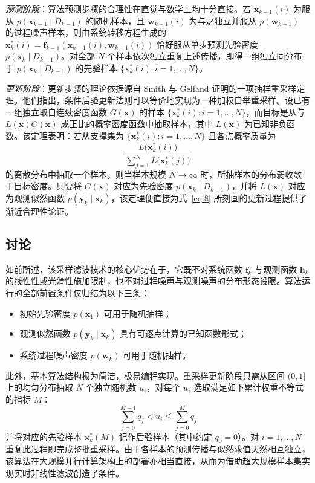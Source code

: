 \emph{预测阶段}：算法预测步骤的合理性在直觉与数学上均十分直接。若 $\bm{x}_{k-1}(i)$ 为服从 $p(\bm{x}_{k-1} \mid D_{k-1})$ 的随机样本，且 $\bm{w}_{k-1}(i)$ 为与之独立并服从 $p(\bm{w}_{k-1})$ 的过程噪声样本，则由系统转移方程生成的 $\bm{x}_k^*(i) = \bm{f}_{k-1}(\bm{x}_{k-1}(i), \bm{w}_{k-1}(i))$ 恰好服从单步预测先验密度 $p(\bm{x}_k \mid D_{k-1})$。对全部 $N$ 个样本依次独立重复上述传播，即得一组独立同分布于 $p(\bm{x}_k \mid D_{k-1})$ 的先验样本 $\{\bm{x}_k^*(i) : i = 1, \dots, N\}$。

\emph{更新阶段}：更新步骤的理论依据源自 Smith 与 Gelfand \cite{r14} 证明的一项抽样重采样定理。他们指出，条件后验更新法则可以等价地实现为一种加权自举重采样。设已有一组独立取自连续密度函数 $G(\bm{x})$ 的样本 $\{\bm{x}_k^*(i) : i = 1, \dots, N\}$，而目标是从与 $L(\bm{x})G(\bm{x})$ 成正比的概率密度函数中抽取样本，其中 $L(\bm{x})$ 为已知非负函数。该定理表明：若从支撑集为 $\{\bm{x}_k^*(i) : i = 1, \dots, N\}$ 且各点概率质量为
\begin{equation*}
\frac{L\bigl(\bm{x}_k^*(i)\bigr)}{\sum_{j=1}^N L\bigl(\bm{x}_k^*(j)\bigr)}
\end{equation*}
的离散分布中抽取一个样本，则当样本规模 $N \to \infty$ 时，所抽样本的分布弱收敛于目标密度。只要将 $G(\bm{x})$ 对应为先验密度 $p(\bm{x}_k \mid D_{k-1})$，并将 $L(\bm{x})$ 对应为观测似然函数 $p(\bm{y}_k \mid \bm{x}_k)$，该定理便直接为式~\eqref{eq:8} 所刻画的更新过程提供了渐近合理性论证。

\subsection{讨论}\label{sec:disc}

如前所述，该采样滤波技术的核心优势在于，它既不对系统函数 $\bm{f}_k$ 与观测函数 $\bm{h}_k$ 的线性性或光滑性施加限制，也不对过程噪声与观测噪声的分布形态设限。算法运行的全部前置条件仅归结为以下三条：

\begin{itemize}
\item 初始先验密度 $p(\bm{x}_1)$ 可用于随机抽样；
\item 观测似然函数 $p(\bm{y}_k \mid \bm{x}_k)$ 具有可逐点计算的已知函数形式；
\item 系统过程噪声密度 $p(\bm{w}_k)$ 可用于随机抽样。
\end{itemize}

此外，基本算法结构极为简洁，极易编程实现。重采样更新阶段只需从区间 $(0, 1]$ 上的均匀分布抽取 $N$ 个独立随机数 $u_i$，对每个 $u_i$ 选取满足如下累计权重不等式的指标 $M$：
\begin{equation*}
\sum_{j=0}^{M-1} q_j < u_i \leq \sum_{j=0}^{M} q_j
\end{equation*}
并将对应的先验样本 $\bm{x}_k^*(M)$ 记作后验样本（其中约定 $q_0 = 0$）。对 $i = 1, \dots, N$ 重复此过程即完成整批重采样。由于各样本的预测传播与似然求值天然相互独立，该算法在大规模并行计算架构上的部署亦相当直接，从而为借助超大规模样本集实现实时非线性滤波创造了条件。

